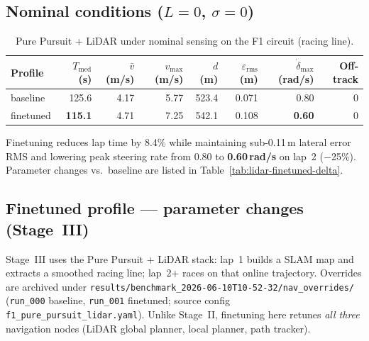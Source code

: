 \documentclass[11pt,a4paper]{article}
\newcommand{\runref}[1]{\texttt{results/#1}}
\newcommand{\best}[1]{\textbf{#1}}
\begin{document}
\subsection{Nominal conditions ($L = 0$, $\sigma = 0$)}

\begin{table}[H]
  \centering
  \caption{Pure Pursuit + LiDAR under nominal sensing on the F1 circuit (racing line).}
  \label{tab:lidar-nominal}
  \small
  \begin{tabular}{@{}lrrrrrrr@{}}
    \toprule
    Profile & $T_{\mathrm{med}}$ (s) & $\bar{v}$ (m/s) & $v_{\max}$ (m/s) &
    $d$ (m) & $\varepsilon_{\mathrm{rms}}$ (m) &
    $\dot{\delta}_{\max}$ (rad/s) & Off-track \\
    \midrule
    baseline  & 125.6 & 4.17 & 5.77 & 523.4 & 0.071 & 0.80 & 0 \\
    finetuned & \best{115.1} & 4.71 & 7.25 & 542.1 & 0.108 & \best{0.60} & 0 \\
    \bottomrule
  \end{tabular}
\end{table}

Finetuning reduces lap time by 8.4\% while maintaining sub-0.11\,m
lateral error RMS and lowering peak steering rate from 0.80 to
\best{0.60\,rad/s} on lap~2 ($-$25\%).
Parameter changes vs.\ baseline are listed in
Table~\ref{tab:lidar-finetuned-delta}.

\subsection{Finetuned profile --- parameter changes (Stage~III)}
\label{sec:f1-finetuned-params-iii}

Stage~III uses the Pure Pursuit + LiDAR stack: lap~1 builds a SLAM map
and extracts a smoothed racing line; lap~2+ races on that online trajectory.
Overrides are archived under
\runref{benchmark\_2026-06-10T10-52-32/nav\_overrides/}
(\texttt{run\_000} baseline, \texttt{run\_001} finetuned;
source config \texttt{f1\_pure\_pursuit\_lidar.yaml}).
Unlike Stage~II, finetuning here retunes \emph{all three} navigation nodes
(LiDAR global planner, local planner, path tracker).
\end{document}
